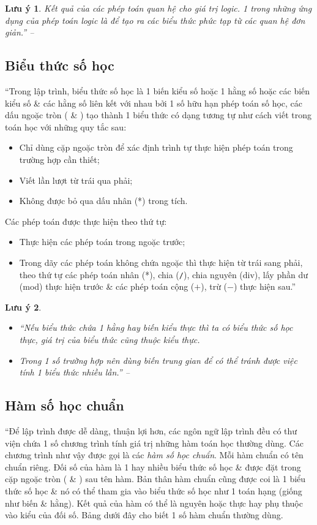 \documentclass[oneside]{book}
\numberwithin{equation}{section}
\newtheorem{luuy}{Lưu ý}[section]
\begin{document}
\begin{luuy}
	Kết quả của các phép toán quan hệ cho giá trị logic. 1 trong những ứng dụng của phép toán logic là để tạo ra các biểu thức phức tạp từ các quan hệ đơn giản.'' -- \cite[p. 24]{SGK_Tin_Hoc_11}
\end{luuy}

\subsection{Biểu thức số học}
``Trong lập trình, biểu thức số học là 1 biến kiểu số hoặc 1 hằng số hoặc các biến kiểu số \& các hằng số liên kết với nhau bởi 1 số hữu hạn phép toán số học, các dấu ngoặc tròn ( \& ) tạo thành 1 biểu thức có dạng tương tự như cách viết trong toán học với những quy tắc sau:
\begin{itemize}
	\item Chỉ dùng cặp ngoặc tròn để xác định trình tự thực hiện phép toán trong trường hợp cần thiết;
	\item Viết lần lượt từ trái qua phải;
	\item Không được bỏ qua dấu nhân (*) trong tích.
\end{itemize}
Các phép toán được thực hiện theo thứ tự:
\begin{itemize}
	\item Thực hiện các phép toán trong ngoặc trước;
	\item Trong dãy các phép toán không chứa ngoặc thì thực hiện từ trái sang phải, theo thứ tự các phép toán nhân (*), chia (\texttt{/}), chia nguyên (div), lấy phần dư (mod) thực hiện trước \& các phép toán cộng ($+$), trừ ($-$) thực hiện sau.''
\end{itemize}

\begin{luuy}
	\begin{itemize}
		\item ``Nếu biểu thức chứa 1 hằng hay biến kiểu thực thì ta có biểu thức số học thực, giá trị của biểu thức cũng thuộc kiểu thực.
		\item Trong 1 số trường hợp nên dùng biến trung gian để có thể tránh được việc tính 1 biểu thức nhiều lần.'' -- \cite[p. 25]{SGK_Tin_Hoc_11}
	\end{itemize}
\end{luuy}

\subsection{Hàm số học chuẩn}
``Để lập trình được dễ dàng, thuận lợi hơn, các ngôn ngữ lập trình đều có thư viện chứa 1 số chương trình tính giá trị những hàm toán học thường dùng. Các chương trình như vậy được gọi là các \textit{hàm số học chuẩn}. Mỗi hàm chuẩn có tên chuẩn riêng. Đối số của hàm là 1 hay nhiều biểu thức số học \& được đặt trong cặp ngoặc tròn ( \& ) sau tên hàm. Bản thân hàm chuẩn cũng được coi là 1 biểu thức số học \& nó có thể tham gia vào biểu thức số học như 1 toán hạng (giống như biến \& hằng). Kết quả của hàm có thể là nguyên hoặc thực hay phụ thuộc vào kiểu của đối số. Bảng dưới đây cho biết 1 số hàm chuẩn thường dùng.
\end{document}

